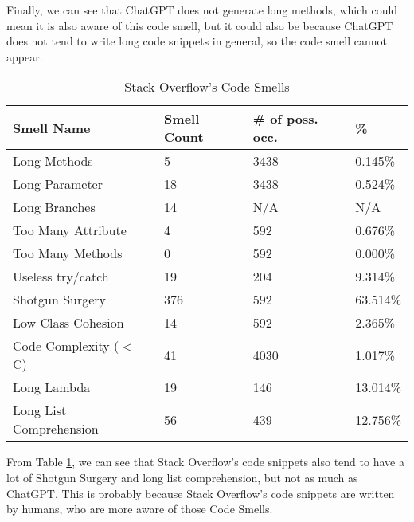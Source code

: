 Finally, we can see that ChatGPT does not generate long methods, which could mean it is also aware of this code smell, but it could also be because ChatGPT does not tend to write long code snippets in general, so the code smell cannot appear.

\begin{table}[!ht]
    \centering
    \caption{Stack Overflow's Code Smells}
    \begin{tabular}{llll}
        \hline
        \textbf{Smell Name}     & \textbf{Smell Count} & \textbf{\# of poss. occ.} & \textbf{\%} \\ \hline
        Long Methods            & 5                    & 3438                      & 0.145\%     \\
        Long Parameter          & 18                   & 3438                      & 0.524\%     \\
        Long Branches           & 14                   & N/A                       & N/A         \\
        Too Many Attribute      & 4                    & 592                       & 0.676\%     \\
        Too Many Methods        & 0                    & 592                       & 0.000\%     \\
        Useless try/catch       & 19                   & 204                       & 9.314\%     \\
        Shotgun Surgery         & 376                  & 592                       & 63.514\%    \\
        Low Class Cohesion      & 14                   & 592                       & 2.365\%     \\
        Code Complexity ($<$ C) & 41                   & 4030                      & 1.017\%     \\
        Long Lambda             & 19                   & 146                       & 13.014\%    \\
        Long List Comprehension & 56                   & 439                       & 12.756\%    \\ \hline
    \end{tabular}
    \label{table:result-so}
\end{table}

From Table \ref{table:result-so}, we can see that Stack Overflow's code snippets also tend to have a lot of Shotgun Surgery and long list comprehension, but not as much as ChatGPT. This is probably because Stack Overflow's code snippets are written by humans, who are more aware of those Code Smells.

